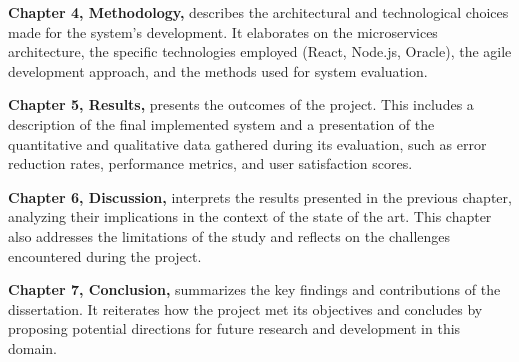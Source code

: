 \textbf{Chapter 4, Methodology,} describes the architectural and technological choices made for the system's development. It elaborates on the microservices architecture, the specific technologies employed (React, Node.js, Oracle), the agile development approach, and the methods used for system evaluation.

\textbf{Chapter 5, Results,} presents the outcomes of the project. This includes a description of the final implemented system and a presentation of the quantitative and qualitative data gathered during its evaluation, such as error reduction rates, performance metrics, and user satisfaction scores.

\textbf{Chapter 6, Discussion,} interprets the results presented in the previous chapter, analyzing their implications in the context of the state of the art. This chapter also addresses the limitations of the study and reflects on the challenges encountered during the project.

\textbf{Chapter 7, Conclusion,} summarizes the key findings and contributions of the dissertation. It reiterates how the project met its objectives and concludes by proposing potential directions for future research and development in this domain. 